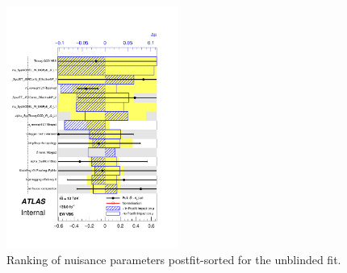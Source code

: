 \begin{figure}[ht]
      \centering
        \includegraphics[width=0.5\textwidth]{figures/Fit_np_rank/pulls_mu_Global/pulls_mu_SemileptonicVBS_5.pdf}
        \caption{Ranking of nuisance parameters postfit-sorted for the unblinded fit.}
       \label{fig:fit_1lep_ranking_all_data}
\end{figure}


